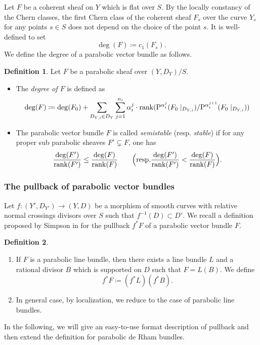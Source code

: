 \documentclass[12pt,twoside]{book}
\theoremstyle{plain}
\theoremstyle{definition}
\newtheorem{definition}[definition]{Definition}
\theoremstyle{remark}
\numberwithin{equation}{section}
\def\P{{\mathrm{P}}}
\begin{document}
Let $F$ be a coherent sheaf on $Y$ which is flat over $S$. By the locally constancy of the Chern classes, the first Chern class of the coherent sheaf $F_s$ over the curve $Y_s$ for any points $s\in S$ does not depend on the choice of the point $s$. It is well-defined to set
\[\deg(F)\coloneqq c_1(F_s).\]
We define the degree of a parabolic vector bundle as follows.
\begin{definition} Let $F$ be a parabolic sheaf over $(Y,D_Y)/S$.
\begin{itemize}
\item The \emph{degree of $F$} is defined as
\[\deg(F) \coloneqq \deg(F_0) + \sum_{D_{Y,i}\in D_Y}\sum_{j=1}^{n_i} \alpha_i^j \cdot \rank( \P^{\alpha_i^j}(F_0\mid_{D_{Y,i}})/\P^{\alpha_i^{j+1}}(F_0\mid_{D_{Y,i}})) \]
\item The parabolic vector bundle $F$ is called \emph{semistable} (resp. \emph{stable}) if for any proper sub parabolic sheaves $F'\subsetneq F$, one has
\[\frac{\deg(F')}{\rank(F')} \leq \frac{\deg(F)}{\rank(F)} \qquad \text{\Big(resp.} \frac{\deg(F')}{\rank(F')} < \frac{\deg(F)}{\rank(F)} \text{\Big)}.\]
\end{itemize}
\end{definition}

\subsubsection{The pullback of parabolic vector bundles}

Let $f\colon (Y',D_{Y'}) \rightarrow (Y,D)$ be a morphism of smooth curves with relative normal crossings divisors over $S$ such that $f^{-1}(D)\subset D'$. We recall a definition proposed by Simpson in \cite[Section 2.2]{IySi07} for the pullback $f^*F$ of a parabolic vector bundle $F$.

\begin{definition} \label{def:pullbackbundle}
\begin{enumerate}
\item[(1)] If $F$ is a parabolic line bundle, then there exists a line bundle $L$ and a rational divisor $B$ which is supported on $D$ such that $F=L(B)$. We define
\[f^*F \coloneqq (f^*L)(f^*B).\]
\item[(2)] In general case, by localization, we reduce to the case of parabolic line bundles.
\end{enumerate}
\end{definition}
In the following, we will give an easy-to-use format description of pullback and then extend the definition for parabolic de Rham bundles.
\end{document}
